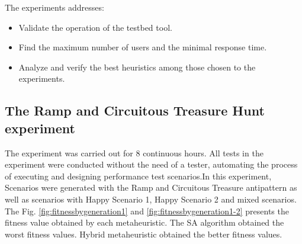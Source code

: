 \documentclass[times]{stvrauth}
\begin{document}
The experiments addresses:

\begin{itemize}
\item Validate the operation of the testbed tool.
\item Find the maximum number of users and the minimal response time.
\item Analyze and verify the best heuristics among those chosen to the experiments.
\end{itemize}


\subsection{The Ramp and Circuitous Treasure Hunt experiment}

The experiment was carried out for 8 continuous hours.  All tests in the experiment were conducted without the need of a tester, automating the process of executing and designing performance test scenarios.In this experiment, Scenarios were generated with the Ramp and Circuitous Treasure antipattern as well as scenarios with Happy Scenario 1, Happy Scenario 2 and mixed scenarios. The Fig. \ref{fig:fitnessbygeneration1} and \ref{fig:fitnessbygeneration1-2} presents the fitness value obtained by each metaheuristic. The SA algorithm obtained the worst fitness values. Hybrid metaheuristic obtained the better fitness values. 
\end{document}
